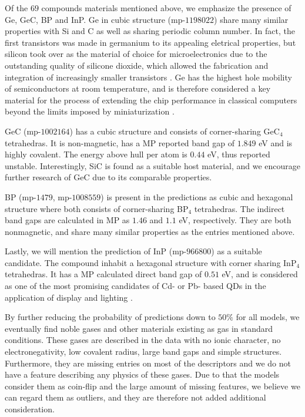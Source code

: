 Of the $69$ compounds materials mentioned above, we emphasize the presence of Ge, GeC, BP and InP. Ge in cubic structure (mp-$1198022$) share many similar properties with Si and C as well as sharing periodic column number. In fact, the first transistors was made in germanium to its appealing eletrical properties, but silicon took over as the material of choice for microelectronics due to the outstanding quality of silicone dioxide, which allowed the fabrication and integration of increasingly smaller transistors \cite{Scappucci2020, Pillarisetty2011}. Ge has the highest hole mobility of semiconductors at room temperature, and is therefore considered a key material for the process of extending the chip performance in classical computers beyond the limits imposed by miniaturization \cite{Scappucci2020}.

GeC (mp-$1002164$) \cite{GeC} has a cubic structure and consists of corner-sharing GeC$_4$ tetrahedras. It is non-magnetic, has a MP reported band gap of $1.849$ eV and is highly covalent. The energy above hull per atom is $0.44$ eV, thus reported unstable. Interestingly, SiC is found as a suitable host material, and we encourage further research of GeC due to its comparable properties.

BP (mp-$1479$, mp-$1008559$) is present in the predictions as cubic \cite{BP1} and hexagonal \cite{BP2} structure where both consists of corner-sharing BP$_4$ tetrahedras. The indirect band gaps are calculated in MP as $1.46$ and $1.1$ eV, respectively. They are both nonmagnetic, and share many similar properties as the entries mentioned above.

Lastly, we will mention the prediction of InP (mp-$966800$) \cite{InP} as a suitable candidate. The compound inhabit a hexagonal structure with corner sharing InP$_4$ tetrahedras. It has a MP calculated direct band gap of $0.51$ eV, and is considered as one of the most promising candidates of Cd- or Pb- based QDs in the application of display and lighting \cite{Zhang2020a, Won2019}.

By further reducing the probability of predictions down to $50\%$ for all models, we eventually find noble gases and other materials existing as gas in standard conditions. These gases are described in the data with no ionic character, no electronegativity, low covalent radius, large band gaps and simple structures. Furthermore, they are missing entries on most of the descriptors and we do not have a feature describing any physics of these gases. Due to that the models consider them as coin-flip and the large amount of missing features, we believe we can regard them as outliers, and they are therefore not added additional consideration.

